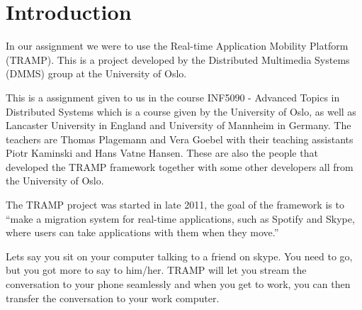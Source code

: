 \section{Introduction}
In our assignment we were to use the Real-time Application Mobility Platform (TRAMP). This is a project developed by the Distributed Multimedia Systems (DMMS) group at the University of Oslo.

This is a assignment given to us in the course INF5090 - Advanced Topics in Distributed Systems which is a course given by the University of Oslo, as well as Lancaster University in England and University of Mannheim in Germany. The teachers are Thomas Plagemann and Vera Goebel with their teaching assistants Piotr Kaminski and Hans Vatne Hansen. These are also the people that developed the TRAMP framework together with some other developers all from the University of Oslo.

The TRAMP project was started in late 2011, the goal of the framework is to ``make a migration system for real-time applications, such as Spotify and Skype, where users can take applications with them when they move.'' \cite{TRAMP-homepage}

Lets say you sit on your computer talking to a friend on skype. You need to go, but you got more to say to him/her. TRAMP will let you stream the conversation to your phone seamlessly and when you get to work, you can then transfer the conversation to your work computer.